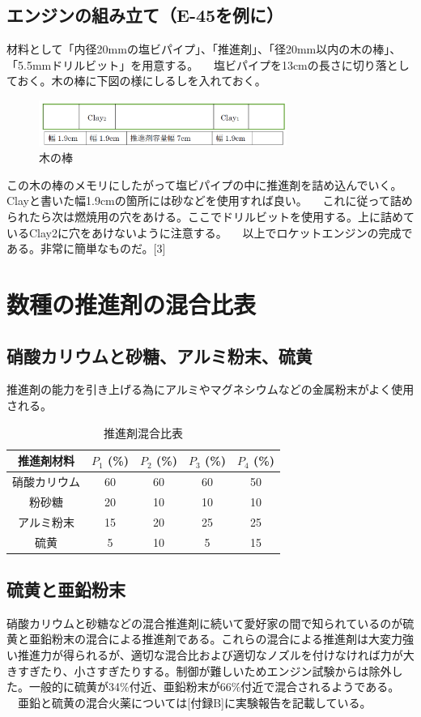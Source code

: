 \subsection{エンジンの組み立て（E-45を例に）}
材料として「内径20mmの塩ビパイプ」、「推進剤」、「径20mm以内の木の棒」、「5.5mmドリルビット」を用意する。
　塩ビパイプを13cmの長さに切り落としておく。木の棒に下図の様にしるしを入れておく。

\begin{figure}[H]
  \centering
  \includegraphics[height=1.5cm,clip]{okada/image/ki.png}
  \caption{木の棒}
  \label{fig:ki}
\end{figure}
この木の棒のメモリにしたがって塩ビパイプの中に推進剤を詰め込んでいく。Clayと書いた幅1.9cmの箇所には砂などを使用すれば良い。
　これに従って詰められたら次は燃焼用の穴をあける。ここでドリルビットを使用する。上に詰めているClay2に穴をあけないように注意する。
　以上でロケットエンジンの完成である。非常に簡単なものだ。[3]
\section{数種の推進剤の混合比表}
\subsection{硝酸カリウムと砂糖、アルミ粉末、硫黄}
推進剤の能力を引き上げる為にアルミやマグネシウムなどの金属粉末がよく使用される。
\begin{table}[H]
\caption{推進剤混合比表}
\centering
\begin{tabular}{c||c|c|c|c}
推進剤材料    &$P_1$ (\%)	&$P_2$ (\%)	&$P_3$ (\%)	&$P_4$ (\%)\\ \hline
硝酸カリウム  &60	         &60	       &60         &50\\
粉砂糖       &20          &10         &10         &10\\
アルミ粉末	  &15	          &20	&25	&25\\
硫黄	&5	&10	&5	&15\\ \hline
\end{tabular}
\end{table}

\subsection{硫黄と亜鉛粉末}
硝酸カリウムと砂糖などの混合推進剤に続いて愛好家の間で知られているのが硫黄と亜鉛粉末の混合による推進剤である。これらの混合による推進剤は大変力強い推進力が得られるが、適切な混合比および適切なノズルを付けなければ力が大きすぎたり、小さすぎたりする。制御が難しいためエンジン試験からは除外した。一般的に硫黄が34\%付近、亜鉛粉末が66\%付近で混合されるようである。
　亜鉛と硫黄の混合火薬については[付録B]に実験報告を記載している。


